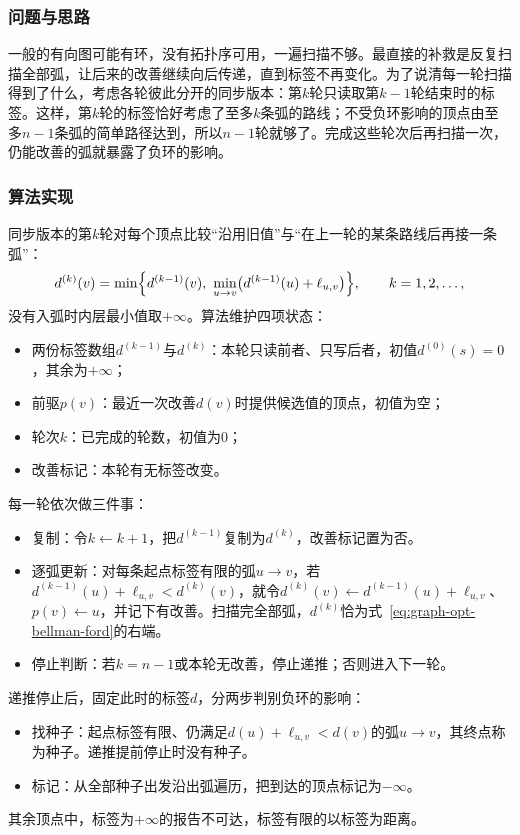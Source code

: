 \subsubsection{问题与思路}

一般的有向图可能有环，没有拓扑序可用，一遍扫描不够。最直接的补救是反复扫描全部弧，让后来的改善继续向后传递，直到标签不再变化。为了说清每一轮扫描得到了什么，考虑各轮彼此分开的同步版本：第$k$轮只读取第$k-1$轮结束时的标签。这样，第$k$轮的标签恰好考虑了至多$k$条弧的路线；不受负环影响的顶点由至多$n-1$条弧的简单路径达到，所以$n-1$轮就够了。完成这些轮次后再扫描一次，仍能改善的弧就暴露了负环的影响。

\subsubsection{算法实现}

同步版本的第$k$轮对每个顶点比较“沿用旧值”与“在上一轮的某条路线后再接一条弧”：
\begin{equation}
  d^{(k)}(v)=\min\Bigl\{d^{(k-1)}(v),\ \min_{u\to v}\bigl(d^{(k-1)}(u)+\ell_{u,v}\bigr)\Bigr\},\qquad k=1,2,\ldots,
  \label{eq:graph-opt-bellman-ford}
\end{equation}
没有入弧时内层最小值取$+\infty$。算法维护四项状态：
\begin{itemize}
  \item 两份标签数组$d^{(k-1)}$与$d^{(k)}$：本轮只读前者、只写后者，初值$d^{(0)}(s)=0$，其余为$+\infty$；
  \item 前驱$p(v)$：最近一次改善$d(v)$时提供候选值的顶点，初值为空；
  \item 轮次$k$：已完成的轮数，初值为$0$；
  \item 改善标记：本轮有无标签改变。
\end{itemize}
每一轮依次做三件事：
\begin{itemize}
  \item 复制：令$k\gets k+1$，把$d^{(k-1)}$复制为$d^{(k)}$，改善标记置为否。
  \item 逐弧更新：对每条起点标签有限的弧$u\to v$，若$d^{(k-1)}(u)+\ell_{u,v}<d^{(k)}(v)$，就令$d^{(k)}(v)\gets d^{(k-1)}(u)+\ell_{u,v}$、$p(v)\gets u$，并记下有改善。扫描完全部弧，$d^{(k)}$恰为式~\eqref{eq:graph-opt-bellman-ford}的右端。
  \item 停止判断：若$k=n-1$或本轮无改善，停止递推；否则进入下一轮。
\end{itemize}
递推停止后，固定此时的标签$d$，分两步判别负环的影响：
\begin{itemize}
  \item 找种子：起点标签有限、仍满足$d(u)+\ell_{u,v}<d(v)$的弧$u\to v$，其终点称为种子。递推提前停止时没有种子。
  \item 标记：从全部种子出发沿出弧遍历，把到达的顶点标记为$-\infty$。
\end{itemize}
其余顶点中，标签为$+\infty$的报告不可达，标签有限的以标签为距离。

